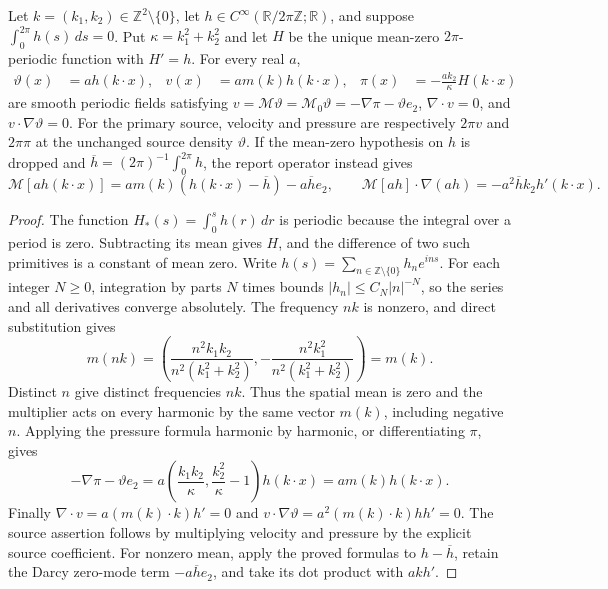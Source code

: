 \begin{proposition}
\label{prop:ipm-wave}
Let $k=(k_1,k_2)\in\mathbb Z^2\setminus\{0\}$, let
$h\in C^\infty(\mathbb R/2\pi\mathbb Z;\mathbb R)$, and suppose
$\int_0^{2\pi}h(s)\,ds=0$. Put $\kappa=k_1^2+k_2^2$ and let $H$ be the
unique mean-zero $2\pi$-periodic function with $H'=h$. For every real $a$,
\begin{align}\label{eq:ipm-periodic-wave}
 \vartheta(x)&=a h(k\cdot x),&
 v(x)&=a m(k)h(k\cdot x),&
 \pi(x)&=-\frac{a k_2}{\kappa}H(k\cdot x)
\end{align}
are smooth periodic fields satisfying
$v=\mathcal M\vartheta=\mathcal M_0\vartheta
=-\nabla\pi-\vartheta e_2$,
$\nabla\cdot v=0$, and $v\cdot\nabla\vartheta=0$.
For the primary source, velocity and pressure are respectively $2\pi v$
and $2\pi\pi$ at the unchanged source density $\vartheta$.
If the mean-zero hypothesis on $h$ is dropped and
$\overline h=(2\pi)^{-1}\int_0^{2\pi}h$, the report operator instead gives
\begin{equation}\label{eq:ipm-nonzero-mean-wave}
 \mathcal M[a h(k\cdot x)]
 =a m(k)(h(k\cdot x)-\overline h)-a\overline h e_2,
 \qquad
 \mathcal M[a h]\cdot\nabla(a h)
 =-a^2\overline h k_2h'(k\cdot x).
\end{equation}
\end{proposition}
\begin{proof}
The function $H_*(s)=\int_0^s h(r)\,dr$ is periodic because the integral
over a period is zero. Subtracting its mean gives $H$, and the difference
of two such primitives is a constant of mean zero. Write
$h(s)=\sum_{n\in\mathbb Z\setminus\{0\}}h_ne^{ins}$.
For each integer $N\ge0$, integration by parts $N$ times bounds
$|h_n|\le C_N|n|^{-N}$, so the series and all derivatives converge
absolutely. The frequency $nk$ is nonzero, and direct substitution gives
\[
 m(nk)=\left(\frac{n^2k_1k_2}{n^2(k_1^2+k_2^2)},
 -\frac{n^2k_1^2}{n^2(k_1^2+k_2^2)}\right)=m(k).
\]
Distinct $n$ give distinct frequencies $nk$. Thus the spatial mean is zero
and the multiplier acts on every harmonic by the same vector $m(k)$,
including negative $n$. Applying the pressure formula harmonic by harmonic,
or differentiating $\pi$, gives
\[
 -\nabla\pi-\vartheta e_2
 =a\left(\frac{k_1k_2}{\kappa},\frac{k_2^2}{\kappa}-1\right)h(k\cdot x)
 =a m(k)h(k\cdot x).
\]
Finally $\nabla\cdot v=a(m(k)\cdot k)h'=0$ and
$v\cdot\nabla\vartheta=a^2(m(k)\cdot k)hh'=0$.
The source assertion follows by multiplying velocity and pressure by the
explicit source coefficient. For nonzero mean, apply the proved formulas
to $h-\overline h$, retain the Darcy zero-mode term
$-a\overline h e_2$, and take its dot product with $ak h'$.
\end{proof}

